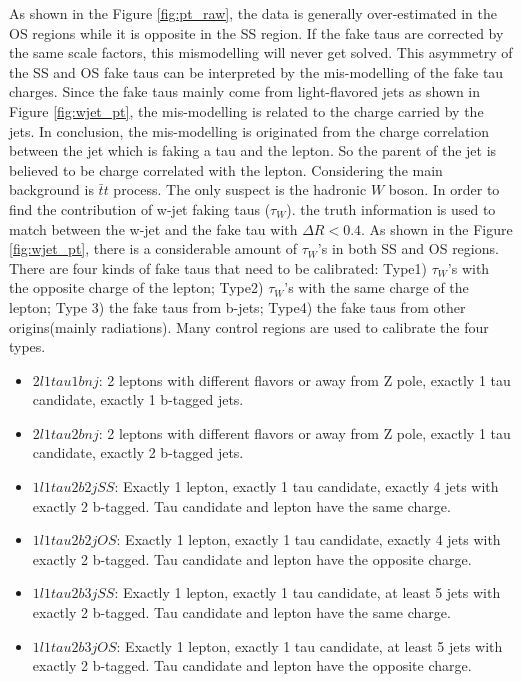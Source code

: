 As shown in the Figure \ref{fig:pt_raw}, the data is generally over-estimated in the OS regions while it is opposite in the SS region. If the fake taus are corrected by the same scale factors, this mismodelling will never get solved. This asymmetry of the SS and OS fake taus can be interpreted by the mis-modelling of the fake tau charges. Since the fake taus mainly come from light-flavored jets as shown in Figure \ref{fig:wjet_pt}, the mis-modelling is related to the charge carried by the jets. In conclusion, the mis-modelling is originated from the charge correlation between the jet which is faking a tau and the lepton. So the parent of the jet is believed to be charge correlated with the lepton. Considering the main background is $\bar{t}t$ process. The only suspect is the hadronic $W$ boson. In order to find the contribution of w-jet faking taus ($\tau_{W}$).  the truth information is used to match between the w-jet and the fake tau with $\Delta R < 0.4$. As shown in the Figure \ref{fig:wjet_pt}, there is a considerable amount of $\tau_{W}$'s in both SS and OS regions. There are four kinds of fake taus that need to be calibrated: Type1) $\tau_{W}$'s with the opposite charge of the lepton; Type2) $\tau_{W}$'s with the same charge of the lepton; Type 3) the fake taus from b-jets; Type4) the fake taus from other origins(mainly radiations). Many control regions are used to calibrate the four types.


\begin{itemize}
\item{$2l1tau1bnj$: 2 leptons with different flavors or away from Z pole, exactly 1 tau candidate,  exactly 1 b-tagged jets.}
\item{$2l1tau2bnj$: 2 leptons with different flavors or away from Z pole, exactly 1 tau candidate,  exactly 2 b-tagged jets.}
\item{$1l1tau2b2j SS$: Exactly 1 lepton, exactly 1 tau candidate, exactly 4 jets with exactly 2 b-tagged. Tau candidate and lepton have the same charge.}
\item{$1l1tau2b2j OS$: Exactly 1 lepton, exactly 1 tau candidate, exactly 4 jets with exactly 2 b-tagged. Tau candidate and lepton have the opposite charge.}
\item{$1l1tau2b3j SS$: Exactly 1 lepton, exactly 1 tau candidate, at least 5 jets with exactly 2 b-tagged. Tau candidate and lepton have the same charge.}
\item{$1l1tau2b3j OS$: Exactly 1 lepton, exactly 1 tau candidate, at least 5 jets with exactly 2 b-tagged. Tau candidate and lepton have the opposite charge.}
\end{itemize}


